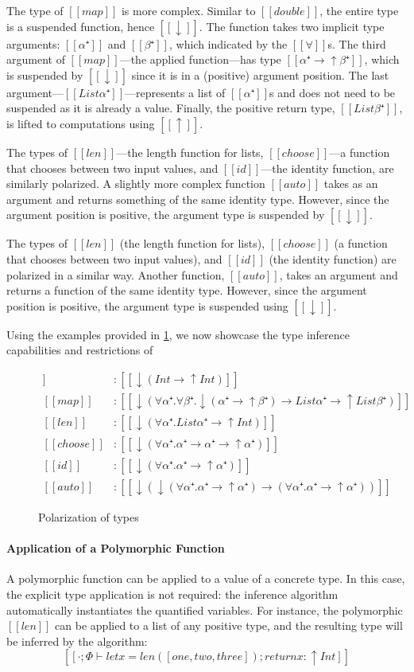 The type of $[[map]]$ is more complex. Similar to $[[double]]$, the
entire type is a suspended function, hence $[[↓]]$. The function takes two implicit type
arguments: $[[α⁺]]$ and $[[β⁺]]$, which indicated by the $[[∀]]$s.
The third argument of $[[map]]$---the applied function---has type $[[α⁺ → ↑β⁺]]$,
which is suspended by $[[↓]]$ since it is in a (positive) argument position. 
The last argument---$[[List α⁺]]$---represents a list of $[[α⁺]]$s and does not need
to be suspended as it is already a value. Finally, the positive return type,
$[[List β⁺]]$, is lifted to computations using $[[↑]]$.

The types of $[[len]]$---the length function for lists, $[[choose]]$---a
function that chooses between two input values, and $[[id]]$---the identity
function, are similarly polarized. A slightly more complex function $[[auto]]$
takes as an argument and returns something of the same identity type. However,
since the argument position is positive, the argument type is suspended by
$[[↓]]$.

The types of $[[len]]$ (the length function for lists), $[[choose]]$ (a function
that chooses between two input values), and $[[id]]$ (the identity function) are
polarized in a similar way. Another function, $[[auto]]$, takes an argument and returns
a function of the same identity type. However, since the argument position is
positive, the argument type is suspended using $[[↓]]$.

Using the examples provided in \cref{fig:polarization-examples}, we now showcase 
the type inference capabilities and restrictions of \fexists

\begin{figure}[t]
  \begin{align*}
    [[double]] &: [[↓(Int → ↑Int)]] \\
    [[map]] &: [[↓(∀α⁺.∀β⁺.↓(α⁺ → ↑β⁺) → List α⁺ → ↑List β⁺)]] \\
    [[len]] &: [[↓(∀α⁺.List α⁺ → ↑Int)]] \\
    [[choose]] &: [[↓(∀α⁺.α⁺ → α⁺ → ↑α⁺)]] \\
    [[id]] &: [[↓(∀α⁺.α⁺ → ↑α⁺)]] \\
    [[auto]] &: [[↓(↓(∀α⁺.α⁺ → ↑α⁺) → (∀α⁺.α⁺ → ↑α⁺))]]
  \end{align*}
  \caption{Polarization of \systemf types}
  \label{fig:polarization-examples}
\end{figure}

\paragraph*{Application of a Polymorphic Function}
  A polymorphic function can be applied to a value of a concrete type. In this
  case, the explicit type application is not required: the inference algorithm
  automatically instantiates the quantified variables. For instance, the
  polymorphic $[[len]]$ can be applied to a list of any positive type, and the
  resulting type will be inferred by the algorithm:
  $$[[· ; Φ ⊢ let x = len([one,two,three]); return x : ↑Int]]$$

